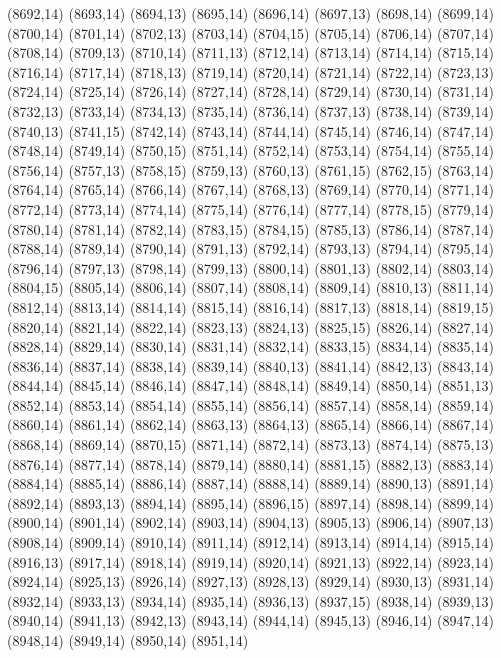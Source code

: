 (8692,14)
(8693,14)
(8694,13)
(8695,14)
(8696,14)
(8697,13)
(8698,14)
(8699,14)
(8700,14)
(8701,14)
(8702,13)
(8703,14)
(8704,15)
(8705,14)
(8706,14)
(8707,14)
(8708,14)
(8709,13)
(8710,14)
(8711,13)
(8712,14)
(8713,14)
(8714,14)
(8715,14)
(8716,14)
(8717,14)
(8718,13)
(8719,14)
(8720,14)
(8721,14)
(8722,14)
(8723,13)
(8724,14)
(8725,14)
(8726,14)
(8727,14)
(8728,14)
(8729,14)
(8730,14)
(8731,14)
(8732,13)
(8733,14)
(8734,13)
(8735,14)
(8736,14)
(8737,13)
(8738,14)
(8739,14)
(8740,13)
(8741,15)
(8742,14)
(8743,14)
(8744,14)
(8745,14)
(8746,14)
(8747,14)
(8748,14)
(8749,14)
(8750,15)
(8751,14)
(8752,14)
(8753,14)
(8754,14)
(8755,14)
(8756,14)
(8757,13)
(8758,15)
(8759,13)
(8760,13)
(8761,15)
(8762,15)
(8763,14)
(8764,14)
(8765,14)
(8766,14)
(8767,14)
(8768,13)
(8769,14)
(8770,14)
(8771,14)
(8772,14)
(8773,14)
(8774,14)
(8775,14)
(8776,14)
(8777,14)
(8778,15)
(8779,14)
(8780,14)
(8781,14)
(8782,14)
(8783,15)
(8784,15)
(8785,13)
(8786,14)
(8787,14)
(8788,14)
(8789,14)
(8790,14)
(8791,13)
(8792,14)
(8793,13)
(8794,14)
(8795,14)
(8796,14)
(8797,13)
(8798,14)
(8799,13)
(8800,14)
(8801,13)
(8802,14)
(8803,14)
(8804,15)
(8805,14)
(8806,14)
(8807,14)
(8808,14)
(8809,14)
(8810,13)
(8811,14)
(8812,14)
(8813,14)
(8814,14)
(8815,14)
(8816,14)
(8817,13)
(8818,14)
(8819,15)
(8820,14)
(8821,14)
(8822,14)
(8823,13)
(8824,13)
(8825,15)
(8826,14)
(8827,14)
(8828,14)
(8829,14)
(8830,14)
(8831,14)
(8832,14)
(8833,15)
(8834,14)
(8835,14)
(8836,14)
(8837,14)
(8838,14)
(8839,14)
(8840,13)
(8841,14)
(8842,13)
(8843,14)
(8844,14)
(8845,14)
(8846,14)
(8847,14)
(8848,14)
(8849,14)
(8850,14)
(8851,13)
(8852,14)
(8853,14)
(8854,14)
(8855,14)
(8856,14)
(8857,14)
(8858,14)
(8859,14)
(8860,14)
(8861,14)
(8862,14)
(8863,13)
(8864,13)
(8865,14)
(8866,14)
(8867,14)
(8868,14)
(8869,14)
(8870,15)
(8871,14)
(8872,14)
(8873,13)
(8874,14)
(8875,13)
(8876,14)
(8877,14)
(8878,14)
(8879,14)
(8880,14)
(8881,15)
(8882,13)
(8883,14)
(8884,14)
(8885,14)
(8886,14)
(8887,14)
(8888,14)
(8889,14)
(8890,13)
(8891,14)
(8892,14)
(8893,13)
(8894,14)
(8895,14)
(8896,15)
(8897,14)
(8898,14)
(8899,14)
(8900,14)
(8901,14)
(8902,14)
(8903,14)
(8904,13)
(8905,13)
(8906,14)
(8907,13)
(8908,14)
(8909,14)
(8910,14)
(8911,14)
(8912,14)
(8913,14)
(8914,14)
(8915,14)
(8916,13)
(8917,14)
(8918,14)
(8919,14)
(8920,14)
(8921,13)
(8922,14)
(8923,14)
(8924,14)
(8925,13)
(8926,14)
(8927,13)
(8928,13)
(8929,14)
(8930,13)
(8931,14)
(8932,14)
(8933,13)
(8934,14)
(8935,14)
(8936,13)
(8937,15)
(8938,14)
(8939,13)
(8940,14)
(8941,13)
(8942,13)
(8943,14)
(8944,14)
(8945,13)
(8946,14)
(8947,14)
(8948,14)
(8949,14)
(8950,14)
(8951,14)

